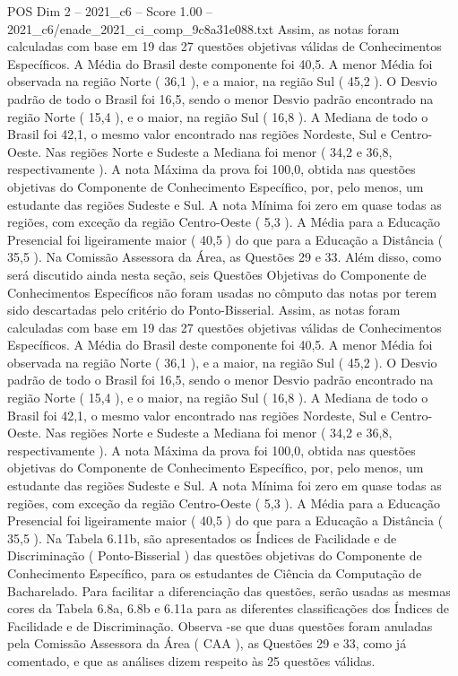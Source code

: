 \begin{textsample}{POS Dim 2 – 2021\_c6 – Score 1.00 – 2021\_c6/enade\_2021\_ci\_comp\_9c8a31e088.txt}
Assim, as notas foram calculadas com base em 19 das 27 questões objetivas válidas de Conhecimentos Específicos.
A Média do Brasil deste componente foi 40,5.
A menor Média foi observada na região Norte ( 36,1 ), e a maior, na região Sul ( 45,2 ).
O Desvio padrão de todo o Brasil foi 16,5, sendo o menor Desvio padrão encontrado na região Norte ( 15,4 ), e o maior, na região Sul ( 16,8 ).
A Mediana de todo o Brasil foi 42,1, o mesmo valor encontrado nas regiões Nordeste, Sul e Centro-Oeste.
Nas regiões Norte e Sudeste a Mediana foi menor ( 34,2 e 36,8, respectivamente ).
A nota Máxima da prova foi 100,0, obtida nas questões objetivas do Componente de Conhecimento Específico, por, pelo menos, um estudante das regiões Sudeste e Sul.
A nota Mínima foi zero em quase todas as regiões, com exceção da região Centro-Oeste ( 5,3 ).
A Média para a Educação Presencial foi ligeiramente maior ( 40,5 ) do que para a Educação a Distância ( 35,5 ).
Na Comissão Assessora da Área, as Questões 29 e 33.
Além disso, como será discutido ainda nesta seção, seis Questões Objetivas do Componente de Conhecimentos Específicos não foram usadas no cômputo das notas por terem sido descartadas pelo critério do Ponto-Bisserial.
Assim, as notas foram calculadas com base em 19 das 27 questões objetivas válidas de Conhecimentos Específicos.
A Média do Brasil deste componente foi 40,5.
A menor Média foi observada na região Norte ( 36,1 ), e a maior, na região Sul ( 45,2 ).
O Desvio padrão de todo o Brasil foi 16,5, sendo o menor Desvio padrão encontrado na região Norte ( 15,4 ), e o maior, na região Sul ( 16,8 ).
A Mediana de todo o Brasil foi 42,1, o mesmo valor encontrado nas regiões Nordeste, Sul e Centro-Oeste.
Nas regiões Norte e Sudeste a Mediana foi menor ( 34,2 e 36,8, respectivamente ).
A nota Máxima da prova foi 100,0, obtida nas questões objetivas do Componente de Conhecimento Específico, por, pelo menos, um estudante das regiões Sudeste e Sul.
A nota Mínima foi zero em quase todas as regiões, com exceção da região Centro-Oeste ( 5,3 ).
A Média para a Educação Presencial foi ligeiramente maior ( 40,5 ) do que para a Educação a Distância ( 35,5 ).
Na Tabela 6.11b, são apresentados os Índices de Facilidade e de Discriminação ( Ponto-Bisserial ) das questões objetivas do Componente de Conhecimento Específico, para os estudantes de Ciência da Computação de Bacharelado.
Para facilitar a diferenciação das questões, serão usadas as mesmas cores da Tabela 6.8a, 6.8b e 6.11a para as diferentes classificações dos Índices de Facilidade e de Discriminação.
Observa -se que duas questões foram anuladas pela Comissão Assessora da Área ( CAA ), as Questões 29 e 33, como já comentado, e que as análises dizem respeito às 25 questões válidas.

\end{textsample}
